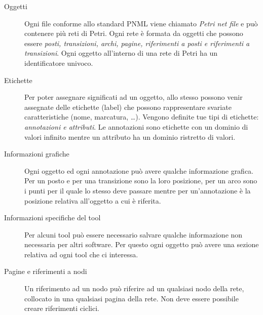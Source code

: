 \documentclass[italian,12pt]{book}
\begin{document}
\begin{description}
\item[Oggetti] Ogni file conforme allo standard PNML viene chiamato
  \emph{Petri net file} e può contenere più reti di Petri. Ogni rete
  è formata da oggetti che possono essere \emph{posti, transizioni,
    archi, pagine, riferimenti a posti e riferimenti a
    transizioni}. Ogni oggetto all'interno di una rete di Petri ha
  un identificatore univoco.
\item[Etichette] Per poter assegnare significati ad un oggetto,
  allo stesso possono venir assegnate delle etichette (label)
  che possono rappresentare svariate caratteristiche (nome,
  marcatura, \dots). Vengono definite tue tipi di etichette:
  \emph{annotazioni e attributi}. Le annotazioni sono etichette
  con un dominio di valori infinito mentre un attributo ha un
  dominio ristretto di valori.
\item[Informazioni grafiche] Ogni oggetto ed ogni annotazione
  può avere qualche informazione grafica. Per un posto e per una
  transizione sono la loro posizione, per un arco sono i punti
  per il quale lo stesso deve passare mentre per un'annotazione
  è la posizione relativa all'oggetto a cui è riferita.
\item[Informazioni specifiche del tool] Per alcuni tool può
  essere necessario salvare qualche informazione non necessaria
  per altri software. Per questo ogni oggetto può avere una
  sezione relativa ad ogni tool che ci interessa.
\item[Pagine e riferimenti a nodi] Un riferimento ad un nodo può
  riferire ad un qualsiasi nodo della rete, collocato in una
  qualsiasi pagina della rete. Non deve essere possibile creare
  riferimenti ciclici.        
\end{description} 
\end{document}
